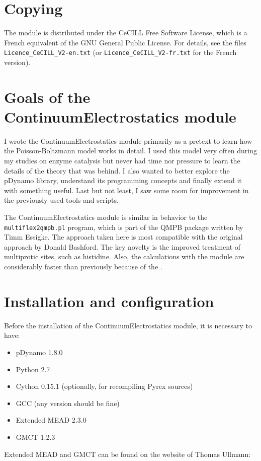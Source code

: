 \documentclass[a4paper,11pt]{article}
\newcommand{\modulename}{ContinuumElectrostatics\xspace}
\begin{document}
\section{Copying}
The module is distributed under the CeCILL Free Software License, which is
a French equivalent of the GNU General Public License.
%
For details, see the files \texttt{Licence\_CeCILL\_V2-en.txt} (or
\texttt{Licence\_CeCILL\_V2-fr.txt} for the French version).


\section{Goals of the \modulename module}
I wrote the \modulename module primarily as a pretext to learn how
the Poisson-Boltzmann model works in detail.
%
I used this model very often during my studies on enzyme catalysis but never had
time nor pressure to learn the details of the theory that was behind.
%
I also wanted to better explore the pDynamo library, understand its programming
concepts and finally extend it with something useful.
%
Last but not least, I saw some room for improvement in the previously used
tools and scripts.

The \modulename module is similar in behavior to the \texttt{multiflex2qmpb.pl}
program, which is part of the QMPB package written by Timm Essigke\cite{Essigke_PhD}.
%
The approach taken here is most compatible with the original approach
by Donald Bashford\cite{Bashford1992}.
%
The key novelty is the improved treatment of multiprotic sites, 
such as histidine.
%
Also, the calculations with the \makebox{\modulename} module are considerably faster 
than previously because of the .

%


\section{Installation and configuration}
Before the installation of the \modulename module, it is necessary
to have:
\begin{itemize}
  \setlength{\itemsep}{2pt}
  \item pDynamo 1.8.0
  \item Python 2.7
  \item Cython 0.15.1 (optionally, for recompiling Pyrex sources)
  \item GCC (any version should be fine)
  \item Extended MEAD 2.3.0
  \item GMCT 1.2.3
\end{itemize}
%
Extended MEAD and GMCT can be found on the website of Thomas Ullmann:
\end{document}
